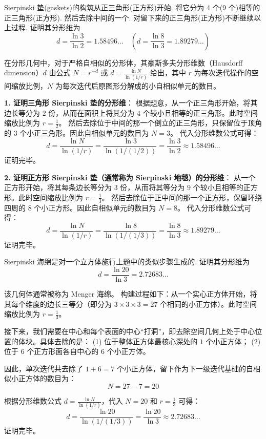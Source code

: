 \begin{exercise}\label{ex:28.2}
Sierpinski 垫(gaskets)的构筑从正三角形(正方形)开始. 将它分为 4 个(9 个)相等的正三角形(正方形). 然后去除中间的一个. 对留下来的正三角形(正方形)不断继续以上过程. 证明其分形维为
$$ d = \frac{\ln 3}{\ln 2} = 1.58496\dots \quad \left( d = \frac{\ln 8}{\ln 3} = 1.89279\dots \right) $$
\end{exercise}
\begin{solution}
在分形几何中，对于严格自相似的分形体，其豪斯多夫分形维数（Hausdorff dimension）$d$ 由公式 $N = r^{-d}$ 或 $d = \frac{\ln N}{\ln(1/r)}$ 给出，其中 $r$ 为每次迭代操作的空间缩放比例，$N$ 为每次迭代后原图形分解成的小自相似单元的数目。

\textbf{1. 证明三角形 Sierpinski 垫的分形维}：
根据题意，从一个正三角形开始，将其边长等分为 $2$ 份，从而在面积上将其分为 $4$ 个较小且相等的正三角形。此时空间缩放比例为 $r = \frac{1}{2}$。
然后去除位于中间的那一个倒立的正三角形，只保留位于顶角的 $3$ 个小正三角形。因此自相似单元的数目为 $N = 3$。
代入分形维数公式可得：
$$ d = \frac{\ln N}{\ln(1/r)} = \frac{\ln 3}{\ln(1/(1/2))} = \frac{\ln 3}{\ln 2} \approx 1.58496\dots $$
证明完毕。

\textbf{2. 证明正方形 Sierpinski 垫（通常称为 Sierpinski 地毯）的分形维}：
从一个正方形开始，将其每条边长等分为 $3$ 份，从而将其等分为 $9$ 个较小且相等的正方形。此时空间缩放比例为 $r = \frac{1}{3}$。
然后去除位于正中间的那一个正方形，保留环绕四周的 $8$ 个小正方形。因此自相似单元的数目为 $N = 8$。
代入分形维数公式可得：
$$ d = \frac{\ln N}{\ln(1/r)} = \frac{\ln 8}{\ln(1/(1/3))} = \frac{\ln 8}{\ln 3} \approx 1.89279\dots $$
证明完毕。
\end{solution}

\begin{exercise}\label{ex:28.3}
Sierpinski 海绵是对一个立方体施行上题中的类似步骤生成的. 证明其分形维为
$$ d = \frac{\ln 20}{\ln 3} = 2.72683\dots $$
\end{exercise}
\begin{solution}
该几何体通常被称为 Menger 海绵。
构建过程如下：从一个实心正方体开始，将其每个维度的边长三等分（即分为 $3 \times 3 \times 3 = 27$ 个相同的小正方体）。此时空间缩放比例为 $r = \frac{1}{3}$。

接下来，我们需要在中心和每个表面的中心“打洞”，即去除空间几何上处于中心位置的体块。具体去除的是：
(1) 位于整体正方体最核心深处的 $1$ 个小正方体；
(2) 位于 $6$ 个正方形面各自中心的 $6$ 个小正方体。

因此，单次迭代共去除了 $1 + 6 = 7$ 个小正方体，留下作为下一级迭代基础的自相似小正方体的数目为：
$$ N = 27 - 7 = 20 $$

根据分形维数公式 $d = \frac{\ln N}{\ln(1/r)}$，代入 $N = 20$ 和 $r = \frac{1}{3}$ 可得：
$$ d = \frac{\ln 20}{\ln(1/(1/3))} = \frac{\ln 20}{\ln 3} \approx 2.72683\dots $$
证明完毕。
\end{solution}

